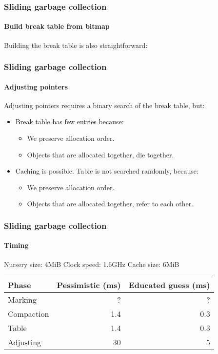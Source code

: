 \documentclass{beamer}
\def\inputfig#1{}
\begin{document}
\begin{frame}
  \frametitle{Sliding garbage collection} 
  \framesubtitle{Build break table from bitmap}

  Building the break table is also straightforward:

  \begin{center}
\inputfig{fig-example-d.pdf_t}
  \end{center}

\end{frame}
\begin{frame}
  \frametitle{Sliding garbage collection} 
  \framesubtitle{Adjusting pointers}

  Adjusting pointers requires a binary search of the break table, but: 

  \begin{itemize}
  \item Break table has few entries because:
    \begin{itemize}
    \item We preserve allocation order.
    \item Objects that are allocated together, die together.
    \end{itemize}
  \item Caching is possible.  Table is not searched randomly, because: 
    \begin{itemize}
    \item We preserve allocation order.
    \item Objects that are allocated together, refer to each other.
    \end{itemize}
  \end{itemize}

\end{frame}
\begin{frame}
  \frametitle{Sliding garbage collection}
  \framesubtitle{Timing}

Nursery size: 4MiB
\vskip 0.25cm
Clock speed: 1.6GHz
\vskip 0.25cm
Cache size: 6MiB
\vskip 0.5cm
\begin{tabular}{|l|r|r|}
  \hline
  Phase & Pessimistic (ms) & Educated guess (ms)\\
  \hline
  \hline
  Marking & ? & ?\\
  \hline
  Compaction & 1.4 &  0.3\\
  \hline
  Table   & 1.4 & 0.3 \\
  \hline
  Adjusting & 30 & 5 \\
  \hline
\end{tabular}

\end{frame}
\end{document}
